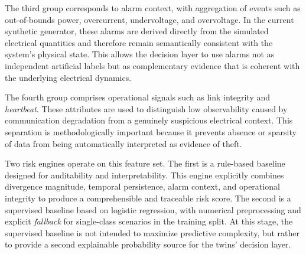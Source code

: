\documentclass[journal]{IEEEtran}
\begin{document}
The third group corresponds to alarm context, with aggregation of events such as out-of-bounds power, overcurrent, undervoltage, and overvoltage. In the current synthetic generator, these alarms are derived directly from the simulated electrical quantities and therefore remain semantically consistent with the system's physical state. This allows the decision layer to use alarms not as independent artificial labels but as complementary evidence that is coherent with the underlying electrical dynamics.

The fourth group comprises operational signals such as link integrity and \textit{heartbeat}. These attributes are used to distinguish low observability caused by communication degradation from a genuinely suspicious electrical context. This separation is methodologically important because it prevents absence or sparsity of data from being automatically interpreted as evidence of theft.

Two risk engines operate on this feature set. The first is a rule-based baseline designed for auditability and interpretability. This engine explicitly combines divergence magnitude, temporal persistence, alarm context, and operational integrity to produce a comprehensible and traceable risk score. The second is a supervised baseline based on logistic regression, with numerical preprocessing and explicit \textit{fallback} for single-class scenarios in the training split. At this stage, the supervised baseline is not intended to maximize predictive complexity, but rather to provide a second explainable probability source for the twins' decision layer.
\end{document}
